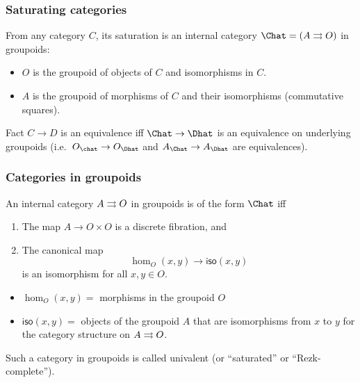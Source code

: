 \documentclass{beamer}
\begin{document}
\begin{frame}
  \frametitle{Saturating categories}
  From any category $C$, its \alert{saturation} is an internal category $\Chat = (A\toto O)$ in groupoids:
  \begin{itemize}
  \item $O$ is the groupoid of objects of $C$ and isomorphisms in $C$.
  \item $A$ is the groupoid of morphisms of $C$ and their isomorphisms (commutative squares).
  \end{itemize}
  \pause
  \begin{block}{Fact}
    $C\to D$ is an equivalence iff $\Chat \to \Dhat$ is an \alert{equivalence on underlying groupoids} (i.e.\ $O_{\chat} \to O_{\Dhat}$ and $A_{\Chat} \to A_{\Dhat}$ are equivalences).
  \end{block}
\end{frame}

\begin{frame}
  \frametitle{Categories in groupoids}
  \begin{theorem}
    An internal category $A\rightrightarrows O$ in groupoids is of the form $\Chat$ iff
    \begin{enumerate}
    \item The map $A\to O\times O$ is a discrete fibration, and
    \item The canonical map
    \[ \hom_O(x,y) \to \mathsf{iso}(x,y) \]
    is an isomorphism for all $x,y\in O$.
    \end{enumerate}
  \end{theorem}
  \begin{itemize}
  \item $\hom_O(x,y)=$ morphisms in the groupoid $O$
  \item $\mathsf{iso}(x,y)=$ objects of the groupoid $A$ that are isomorphisms from $x$ to $y$ for the category structure on $A\rightrightarrows O$.
  \end{itemize}
  Such a category in groupoids is called \alert{univalent} (or ``saturated'' or ``Rezk-complete'').
\end{frame}
\end{document}

